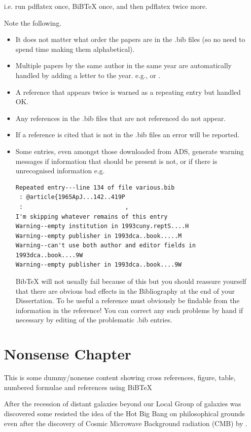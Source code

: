 \documentclass[twoside, fontsize=12pt,
     bibliography=totoc, %
     listof=totoc, %
     index=totoc, %
     onehalfspacing %
]{_MScDiss2017_cls}
\begin{document}
i.e. run pdflatex once, BiBTeX once, and then pdflatex twice more.

Note the following.
\begin{itemize}{}\item It does not matter what order the papers are in the .bib files (so no need to spend time making them alphabetical).
\item Multiple papers by the same author in the same year are automatically handled  by adding a letter to the year. e.g.,  or . 
\item A reference that appears twice is warned as a repeating entry but handled OK. 
\item Any references in the .bib files that are not referenced do not appear.
\item If a reference is cited that is not in the .bib files an error will be reported. 
\item Some entries, even amongst those downloaded from ADS,  generate warning messages if information that should be present  is not, or if there is unrecognised information  e.g.
\begin{verbatim}
Repeated entry---line 134 of file various.bib
 : @article{1965ApJ...142..419P
 :                             ,
I'm skipping whatever remains of this entry
Warning--empty institution in 1993cuny.reptS....H
Warning--empty publisher in 1993dca..book.....M
Warning--can't use both author and editor fields in 1993dca..book....9W
Warning--empty publisher in 1993dca..book....9W
\end{verbatim}
BibTeX will not usually fail because of this but you should reassure yourself that there are obvious bad effects in the Bibliography at the end of your Dissertation. To be useful a reference must obviously be findable from the information in the reference! You can correct any such problems by hand if necessary by editing of the problematic .bib entries.
\end{itemize}

\chapter{Nonsense Chapter }
\label{ch:eqm}
This is some dummy/nonense content showing cross references, figure, table, numbered formulae and references using BiBTeX

After the recession of distant galaxies beyond our Local Group of galaxies  was discovered   some  resisted the idea of the Hot Big Bang on philosophical grounds even after the discovery of Cosmic Microwave Background radiation (CMB) by . 
\end{document}
